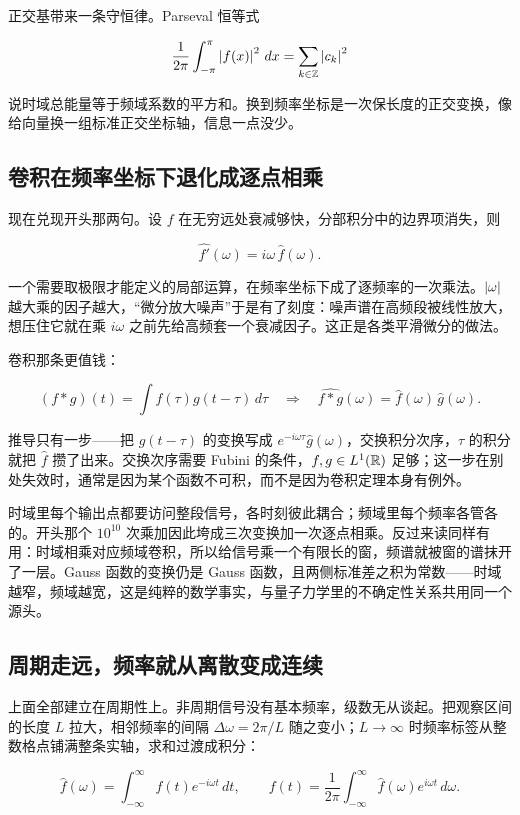正交基带来一条守恒律。Parseval 恒等式

\[
\frac{1}{2\pi}\int_{-\pi}^{\pi}\left|f(x)\right|^2\,dx=\sum_{k\in\mathbb{Z}}\left|c_k\right|^2
\]

说时域总能量等于频域系数的平方和。换到频率坐标是一次保长度的正交变换，像给向量换一组标准正交坐标轴，信息一点没少。

\subsection{卷积在频率坐标下退化成逐点相乘}

现在兑现开头那两句。设 \(f\) 在无穷远处衰减够快，分部积分中的边界项消失，则

\[
\widehat{f'}(\omega)=i\omega\,\hat f(\omega).
\]

一个需要取极限才能定义的局部运算，在频率坐标下成了逐频率的一次乘法。\(\left|\omega\right|\) 越大乘的因子越大，``微分放大噪声''于是有了刻度：噪声谱在高频段被线性放大，想压住它就在乘 \(i\omega\) 之前先给高频套一个衰减因子。这正是各类平滑微分的做法。

卷积那条更值钱：

\[
(f*g)(t)=\int f(\tau)g(t-\tau)\,d\tau
\quad\Longrightarrow\quad
\widehat{f*g}(\omega)=\hat f(\omega)\,\hat g(\omega).
\]

推导只有一步——把 \(g(t-\tau)\) 的变换写成 \(e^{-i\omega\tau}\hat g(\omega)\)，交换积分次序，\(\tau\) 的积分就把 \(\hat f\) 攒了出来。交换次序需要 Fubini 的条件，\(f,g\in L^1(\mathbb{R})\) 足够；这一步在别处失效时，通常是因为某个函数不可积，而不是因为卷积定理本身有例外。

时域里每个输出点都要访问整段信号，各时刻彼此耦合；频域里每个频率各管各的。开头那个 \(10^{10}\) 次乘加因此垮成三次变换加一次逐点相乘。反过来读同样有用：时域相乘对应频域卷积，所以给信号乘一个有限长的窗，频谱就被窗的谱抹开了一层。Gauss 函数的变换仍是 Gauss 函数，且两侧标准差之积为常数——时域越窄，频域越宽，这是纯粹的数学事实，与量子力学里的不确定性关系共用同一个源头。

\subsection{周期走远，频率就从离散变成连续}

上面全部建立在周期性上。非周期信号没有基本频率，级数无从谈起。把观察区间的长度 \(L\) 拉大，相邻频率的间隔 \(\Delta\omega=2\pi/L\) 随之变小；\(L\to\infty\) 时频率标签从整数格点铺满整条实轴，求和过渡成积分：

\[
\hat f(\omega)=\int_{-\infty}^{\infty}f(t)e^{-i\omega t}\,dt,
\qquad
f(t)=\frac{1}{2\pi}\int_{-\infty}^{\infty}\hat f(\omega)e^{i\omega t}\,d\omega.
\]

